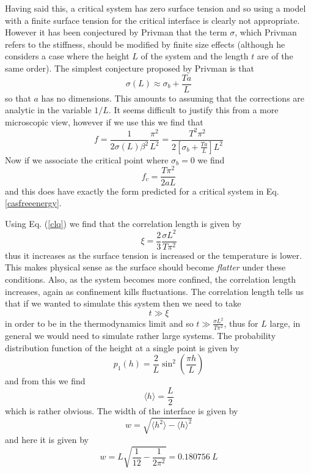 Having said this, a critical system has zero surface tension and so using a model with a finite surface tension for the critical interface is clearly not appropriate. However it has been conjectured by Privman \cite{privman_finite-size_1988-1}  that the term $\sigma$, which Privman refers to the stiffness, should be modified by finite size effects (although he considers a case where the height $L$ of the system and the length $t$ are of the same order).
 The simplest conjecture proposed by Privman\cite{privman_finite-size_1988-1} is that
\begin{equation}
\sigma(L)\approx \sigma_b + \frac{T a}{L}
\end{equation}
so that $a$ has no dimensions.
This amounts to  assuming that the corrections are analytic in the variable $1/L$. It seems difficult to justify this from a more microscopic view, however if we use this we find that
\begin{equation}
f = \frac{1}{2\sigma(L)\beta^2}\frac{\pi^2}{L^2}= \frac{T^2\pi^2}{2[ \sigma_b + \frac{T a}{L}]L^2}
\end{equation}
Now if we associate the critical point where $\sigma_b=0$ we find
\begin{equation}
f_c= \frac{T\pi^2}{2 a L}
\end{equation}
and this does have exactly the form predicted for a critical system in Eq. \eqref{casfreeenergy}.

Using Eq. (\ref{clq}) we find that  the correlation length is given by
\begin{equation}
\xi = \frac{2}{3}\frac{\sigma L^2}{T\pi^2}\label{corel}
\end{equation}
thus it increases as the surface tension is increased or the temperature is lower. This makes physical sense as the surface should become {\em flatter} under these conditions. Also, as the system becomes more confined, the correlation length increases, again as  confinement  
kills fluctuations. The correlation length tells us that if we wanted to simulate this system then we need to take
\begin{equation}
t\gg \xi 
\end{equation}
in order to be in the thermodynamics limit and so $t \gg \frac{\sigma L^2}{T\pi^2}$, thus for 
$L$ large, in general we would need to simulate rather large systems.
The probability distribution function of the height at a single point is given by
\begin{equation}
p_1(h) =\frac{2}{L}\sin^2(\frac{\pi h}{L})
\end{equation}
and from this we find 
\begin{equation}
\langle h\rangle = \frac{L}{2}  
\end{equation}
which is rather obvious. The width of the interface is given by 
\begin{equation}
w=\sqrt{\langle h^2\rangle - \langle h\rangle^2}
\end{equation}
and here it is given by
\begin{equation}
w= L\sqrt{\frac{1}{12}-\frac{1}{2\pi^2}}= 0.180756\  L
\end{equation}

